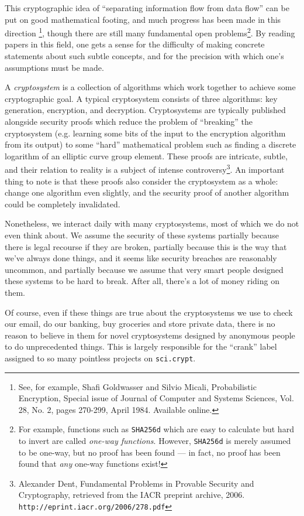 \documentclass[letterpaper]{article}
\begin{document}
This cryptographic idea of ``separating information flow from data flow''
can be put on good mathematical footing, and much progress has been made
in this direction \footnote{See, for example, Shafi Goldwasser and Silvio
Micali, Probabilistic Encryption, Special issue of Journal of Computer and
Systems Sciences, Vol. 28, No. 2, pages 270-299, April 1984. Available online.},
though there are still many fundamental open problems\footnote{For example,
functions such as \texttt{SHA256d} which are easy to calculate but hard to
invert are called \emph{one-way functions}. However, \texttt{SHA256d} is
merely assumed to be one-way, but no proof has been found --- in fact, no
proof has been found that \emph{any} one-way functions exist!}. By reading
papers in this field, one gets a sense for the difficulty of making
concrete statements about such subtle concepts, and for the precision
with which one's assumptions must be made.

A \emph{cryptosystem} is a collection of algorithms which work together
to achieve some cryptographic goal. A typical cryptosystem consists of
three algorithms: key generation, encryption, and decryption. Cryptosystems
are typically published alongside security proofs which reduce the problem
of ``breaking'' the cryptosystem (e.g. learning some bits of the input to
the encryption algorithm from its output) to some ``hard'' mathematical
problem such as finding a discrete logarithm of an elliptic curve group
element. These proofs are intricate, subtle, and their relation to reality
is a subject of intense controversy\footnote{Alexander Dent, Fundamental
Problems in Provable Security and Cryptography, retrieved from the IACR
preprint archive, 2006. \texttt{http://eprint.iacr.org/2006/278.pdf}}. An
important thing to note is that these proofs also consider the cryptosystem
as a whole: change one algorithm even slightly, and the security proof of
another algorithm could be completely invalidated.

Nonetheless, we interact daily with many cryptosystems, most of which we
do not even think about. We assume the security of these systems partially
because there is legal recourse if they are broken, partially because this
is the way that we've always done things, and it seems like security breaches
are reasonably uncommon, and partially because we assume that very smart people
designed these systems to be hard to break. After all, there's a lot of money
riding on them.

Of course, even if these things are true about the cryptosystems we use to
check our email, do our banking, buy groceries and store private data, there
is no reason to believe in them for novel cryptosystems designed by anonymous
people to do unprecedented things. This is largely responsible for the ``crank''
label assigned to so many pointless projects on \texttt{sci.crypt}.
\end{document}
